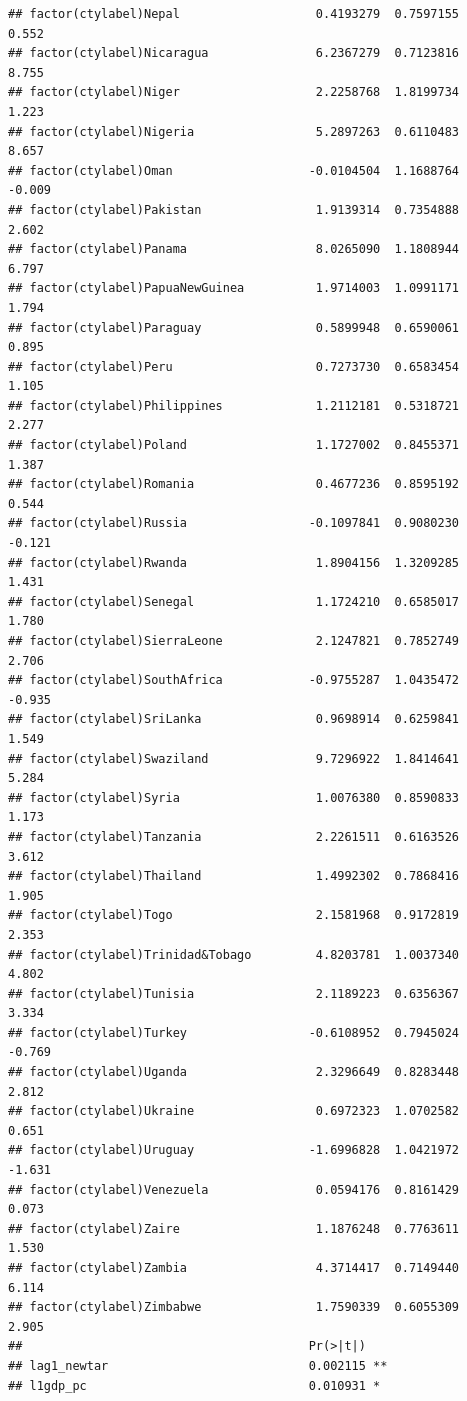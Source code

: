 \documentclass[12pt]{article}\usepackage[]{graphicx}\usepackage[]{color}
\makeatletter
\newenvironment{kframe}{%
 \def\at@end@of@kframe{}%
 \ifinner\ifhmode%
  \def\at@end@of@kframe{\end{minipage}}%
  \begin{minipage}{\columnwidth}%
 \fi\fi%
 \def\FrameCommand##1{\hskip\@totalleftmargin \hskip-\fboxsep
 \colorbox{shadecolor}{##1}\hskip-\fboxsep
     \hskip-\linewidth \hskip-\@totalleftmargin \hskip\columnwidth}%
 \MakeFramed {\advance\hsize-\width
   \@totalleftmargin\z@ \linewidth\hsize
   \@setminipage}}%
 {\par\unskip\endMakeFramed%
 \at@end@of@kframe}
\newenvironment{knitrout}{}{} %
\makeatother
\begin{document}
\begin{knitrout}
\begin{kframe}
\begin{verbatim}
## factor(ctylabel)Nepal                   0.4193279  0.7597155   0.552
## factor(ctylabel)Nicaragua               6.2367279  0.7123816   8.755
## factor(ctylabel)Niger                   2.2258768  1.8199734   1.223
## factor(ctylabel)Nigeria                 5.2897263  0.6110483   8.657
## factor(ctylabel)Oman                   -0.0104504  1.1688764  -0.009
## factor(ctylabel)Pakistan                1.9139314  0.7354888   2.602
## factor(ctylabel)Panama                  8.0265090  1.1808944   6.797
## factor(ctylabel)PapuaNewGuinea          1.9714003  1.0991171   1.794
## factor(ctylabel)Paraguay                0.5899948  0.6590061   0.895
## factor(ctylabel)Peru                    0.7273730  0.6583454   1.105
## factor(ctylabel)Philippines             1.2112181  0.5318721   2.277
## factor(ctylabel)Poland                  1.1727002  0.8455371   1.387
## factor(ctylabel)Romania                 0.4677236  0.8595192   0.544
## factor(ctylabel)Russia                 -0.1097841  0.9080230  -0.121
## factor(ctylabel)Rwanda                  1.8904156  1.3209285   1.431
## factor(ctylabel)Senegal                 1.1724210  0.6585017   1.780
## factor(ctylabel)SierraLeone             2.1247821  0.7852749   2.706
## factor(ctylabel)SouthAfrica            -0.9755287  1.0435472  -0.935
## factor(ctylabel)SriLanka                0.9698914  0.6259841   1.549
## factor(ctylabel)Swaziland               9.7296922  1.8414641   5.284
## factor(ctylabel)Syria                   1.0076380  0.8590833   1.173
## factor(ctylabel)Tanzania                2.2261511  0.6163526   3.612
## factor(ctylabel)Thailand                1.4992302  0.7868416   1.905
## factor(ctylabel)Togo                    2.1581968  0.9172819   2.353
## factor(ctylabel)Trinidad&Tobago         4.8203781  1.0037340   4.802
## factor(ctylabel)Tunisia                 2.1189223  0.6356367   3.334
## factor(ctylabel)Turkey                 -0.6108952  0.7945024  -0.769
## factor(ctylabel)Uganda                  2.3296649  0.8283448   2.812
## factor(ctylabel)Ukraine                 0.6972323  1.0702582   0.651
## factor(ctylabel)Uruguay                -1.6996828  1.0421972  -1.631
## factor(ctylabel)Venezuela               0.0594176  0.8161429   0.073
## factor(ctylabel)Zaire                   1.1876248  0.7763611   1.530
## factor(ctylabel)Zambia                  4.3714417  0.7149440   6.114
## factor(ctylabel)Zimbabwe                1.7590339  0.6055309   2.905
##                                        Pr(>|t|)    
## lag1_newtar                            0.002115 ** 
## l1gdp_pc                               0.010931 *  

\end{verbatim}
\end{kframe}
\end{knitrout}
\end{document}
